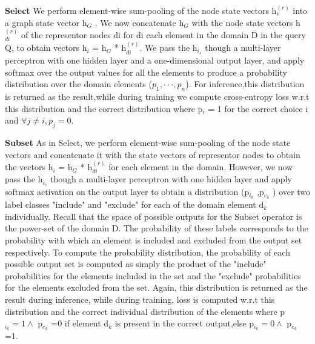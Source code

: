 \documentclass{article}
\begin{document}
\textbf{Select} We perform element-wise sum-pooling of the node state vectors h$^{(r)}_v$ into a graph state vector h$_G$ . We now concatenate h$_G$ with the node state vectors h$^{(r)}_{di}$ of the representor nodes di for di each element in the domain D in the query Q, to obtain vectors h$_i$ = h$_G$ * h$^{(r)}_{di}$. We pass the h$_{i_s}$ though a multi-layer perceptron with one hidden layer and a one-dimensional output layer, and apply softmax over the output values for all the elements to produce a probability distribution over the domain elements ($p_1,··· ,p_n$). For inference,this distribution is returned as the result,while during training we compute cross-entropy loss w.r.t this distribution and the correct distribution where p$_i$ = 1 for the correct choice i and $\forall j \neq i, p_j = 0$.

\textbf{Subset} As in Select, we perform element-wise sum-pooling of the node state vectors and concatenate it with the state vectors of representor nodes to obtain the vectors h$_i$ = h$_G$ * h$^{(r)}_{di}$ for each element in the domain. However, we now pass the h$_{i_s}$ though a multi-layer perceptron with one hidden layer and apply softmax activation on the output layer to obtain a distribution (p$_{i_k}$ ,p$_{e_k}$ ) over two label classes "include" and "exclude" for each of the domain element d$_k$ individually. Recall that the space of possible outputs for the Subset operator is the power-set of the domain D. The probability of these labels corresponds to the probability with which an element is included and excluded from the output set respectively. To compute the probability distribution, the probability of each possible output set is computed as simply the product of the "include" probabilities for the elements included in the set and the "exclude" probabilities for the elements excluded from the set. Again, this distribution is returned as the result during inference, while during training, loss is computed w.r.t this distribution and the correct individual distribution of the elements where p$_{i_k} = 1 \wedge $ p$_{e_k}$ =0 if element d$_k$ is present in the correct output,else p$_{i_k} = 0 \wedge $ p$_{e_k}$ =1.
\end{document}
